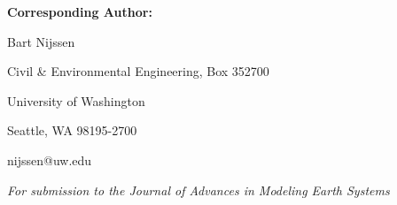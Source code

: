 \textbf{Corresponding Author: }

Bart Nijssen

Civil \& Environmental Engineering, Box 352700

University of Washington

Seattle, WA 98195-2700

nijssen@uw.edu

\centerline{\textit{For submission to the Journal of Advances in Modeling Earth Systems}}

\pagebreak
  
  
  
  
  
  